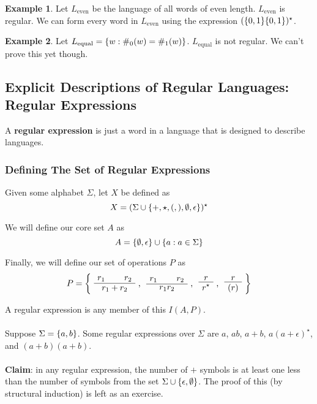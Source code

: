 \documentclass[]{article}
\DeclarePairedDelimiter{\set}{\lbrace}{\rbrace}
\theoremstyle{definition}
\newtheorem{ex}{Example}[section]
\begin{document}
          \begin{ex}
            Let $L_\text{even}$ be the language of all words of even length. $L_\text{even}$ is regular. We can form every word in $L_\text{even}$ using the expression $(\set{0, 1} \set{0, 1})^\star$.
          \end{ex}

          \begin{ex}
            Let $L_\text{equal} = \set{ w : \#_0(w) = \#_1(w) }$. $L_\text{equal}$ is not regular. We can't prove this yet though.
          \end{ex}

      \subsection{Explicit Descriptions of Regular Languages: Regular Expressions}
        A \textbf{regular expression} is just a word in a language that is designed to describe languages.

        \subsubsection{Defining The Set of Regular Expressions}
          Given some alphabet $\Sigma$, let $X$ be defined as
          $$
            X = (\Sigma \cup \set{+, \star, (, ), \emptyset, \epsilon})^\star
          $$

          We will define our core set $A$ as
          $$
            A = \set{\emptyset, \epsilon} \cup \set{ a : a \in \Sigma }
          $$

          Finally, we will define our set of operations $P$ as
          $$
            P = \left\{ \text{\AxiomC{$r_1$} \AxiomC{$r_2$} \BinaryInfC{$r_1 + r_2$} \DisplayProof, \AxiomC{$r_1$} \AxiomC{$r_2$} \BinaryInfC{$r_1 r_2$} \DisplayProof, \AxiomC{$r$} \UnaryInfC{$r^\star$} \DisplayProof, \AxiomC{$r$} \UnaryInfC{$(r)$} \DisplayProof } \right\}
          $$

          A regular expression is any member of this $I(A, P)$.
          \\ \\
          Suppose $\Sigma = \set{a, b}$. Some regular expressions over $\Sigma$ are $a$, $ab$, $a + b$, $a(a + \epsilon)^\star$, and $(a + b)(a + b)$.
          \\ \\
          \textbf{Claim}: in any regular expression, the number of $+$ symbols is at least one less than the number of symbols from the set $\Sigma \cup \set{ \epsilon, \emptyset }$. The proof of this (by structural induction) is left as an exercise.
\end{document}
